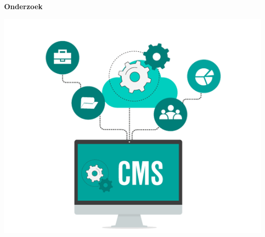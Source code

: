 \begin{titlepage}
   \begin{center}
       \vspace*{1cm}

		\Huge
		\textbf{Onderzoek}

		\vspace{0.5cm}
		
		\LARGE
		\ProjectName
            
		\vspace{1.5cm}

		\textbf{\StudentName}

		\vspace{3.0cm}
		
		\includegraphics[width=1\textwidth]{img/cmsheader.png}
   \end{center}
\end{titlepage}
